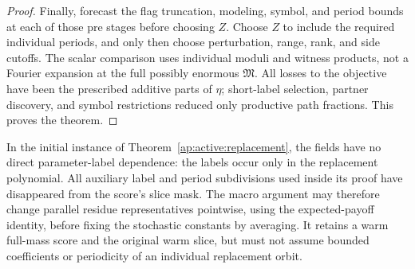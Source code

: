 \begin{proof}
Finally, forecast the flag truncation, modeling, symbol, and period
bounds at each of those pre stages before choosing $Z$.  Choose
$Z$ to include the required individual periods, and only then
choose perturbation, range, rank, and side cutoffs.  The scalar
comparison uses individual moduli and witness products, not a
Fourier expansion at the full possibly enormous $\mathfrak M$.
All losses to the objective have been the prescribed additive
parts of $\eta$; short-label selection, partner discovery, and
symbol restrictions reduced only productive path fractions.
This proves the theorem.
\end{proof}

\begin{remark}\label{ap:active:macro-interface}
In the initial instance of Theorem~\ref{ap:active:replacement}, the
fields have no direct parameter-label dependence: the labels occur
only in the replacement polynomial.  All auxiliary label and period
subdivisions used inside its proof have disappeared from the score's
slice mask.  The macro argument may therefore change parallel
residue representatives pointwise, using the expected-payoff
identity, before fixing the stochastic constants by averaging.
It retains a warm full-mass score and the original warm slice, but
must not assume bounded coefficients or periodicity of an individual
replacement orbit.
\end{remark}
